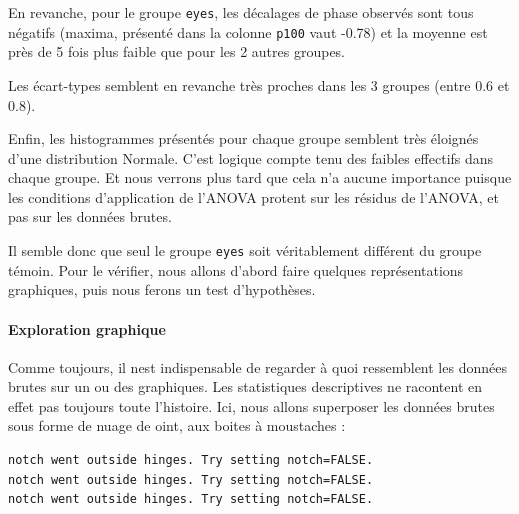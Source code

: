 \documentclass[a4paperpaper,]{article}
\newenvironment{Shaded}{\begin{snugshade}}{\end{snugshade}}
\newcommand{\DataTypeTok}[1]{\textcolor[rgb]{0.00,0.34,0.68}{#1}}
\newcommand{\FloatTok}[1]{\textcolor[rgb]{0.69,0.50,0.00}{#1}}
\newcommand{\KeywordTok}[1]{\textcolor[rgb]{0.12,0.11,0.11}{\textbf{#1}}}
\newcommand{\NormalTok}[1]{\textcolor[rgb]{0.12,0.11,0.11}{#1}}
\newcommand{\OperatorTok}[1]{\textcolor[rgb]{0.12,0.11,0.11}{#1}}
\newcommand{\OtherTok}[1]{\textcolor[rgb]{0.00,0.43,0.16}{#1}}
\newcommand{\StringTok}[1]{\textcolor[rgb]{0.75,0.01,0.01}{#1}}
\let\oldparagraph\paragraph
\renewcommand{\paragraph}[1]{\oldparagraph{#1}\mbox{}}
\begin{document}
En revanche, pour le groupe \texttt{eyes}, les décalages de phase observés sont tous négatifs (maxima, présenté dans la colonne \texttt{p100} vaut -0.78) et la moyenne est près de 5 fois plus faible que pour les 2 autres groupes.

Les écart-types semblent en revanche très proches dans les 3 groupes (entre 0.6 et 0.8).

Enfin, les histogrammes présentés pour chaque groupe semblent très éloignés d'une distribution Normale. C'est logique compte tenu des faibles effectifs dans chaque groupe. Et nous verrons plus tard que cela n'a aucune importance puisque les conditions d'application de l'ANOVA protent sur les résidus de l'ANOVA, et pas sur les données brutes.

Il semble donc que seul le groupe \texttt{eyes} soit véritablement différent du groupe témoin. Pour le vérifier, nous allons d'abord faire quelques représentations graphiques, puis nous ferons un test d'hypothèses.

\hypertarget{exploration-graphique-3}{%
\paragraph{Exploration graphique}\label{exploration-graphique-3}}

Comme toujours, il nest indispensable de regarder à quoi ressemblent les données brutes sur un ou des graphiques. Les statistiques descriptives ne racontent en effet pas toujours toute l'histoire. Ici, nous allons superposer les données brutes sous forme de nuage de oint, aux boites à moustaches :

\begin{Shaded}
\end{Shaded}

\begin{verbatim}
notch went outside hinges. Try setting notch=FALSE.
notch went outside hinges. Try setting notch=FALSE.
notch went outside hinges. Try setting notch=FALSE.
\end{verbatim}
\end{document}
